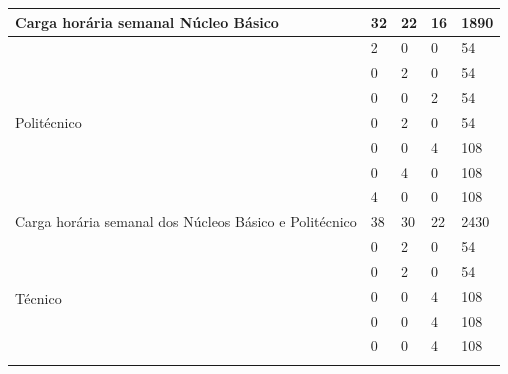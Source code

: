 \documentclass[11pt,fleqn]{book} %
\begin{document}
\begin{table}[H]
{\begin{tabular}{|l|l|l|l|l|l|}
			\multicolumn{2}{|l|}{Carga horária semanal Núcleo Básico}                  & 32         & 22        & 16        & 1890      \\ \hline
			\multirow{7}{*}{Politécnico}   
			& \nameref{disc:info}                                                      & 2          & 0         & 0         & 54        \\ \cline{2-6} 
			& \nameref{disc:espanhol_libras}                                           & 0          & 2         & 0         & 54        \\ \cline{2-6} 
			& \nameref{disc:fermentacao}                                               & 0          & 0         & 2         & 54        \\ \cline{2-6} 
			& \nameref{disc:bioquimica}                                                & 0          & 2         & 0         & 54        \\ \cline{2-6} 
			& \nameref{disc:microbiologia}                                             & 0          & 0         & 4         & 108       \\ \cline{2-6} 
			& \nameref{disc:biomol}                                                    & 0          & 4         & 0         & 108       \\ \cline{2-6} 
			& \nameref{disc:bioeticalab}                                               & 4          & 0         & 0         & 108       \\ \hline			
			\multicolumn{2}{|l|}{Carga horária semanal dos Núcleos Básico  e Politécnico}  & 38         & 30        & 22        & 2430      \\ \hline
			\multirow{7}{*}{Técnico}       
			& \nameref{disc:biotecAnimal}                                              & 0          & 2         & 0         & 54       \\ \cline{2-6} 
			& \nameref{disc:biotecVegetal}                                             & 0          & 2         & 0         & 54       \\ \cline{2-6} 
			& \nameref{disc:biotecAlimentos}                                           & 0          & 0         & 4         & 108       \\ \cline{2-6} 
			& \nameref{disc:biotecFarmacos}                                            & 0          & 0         & 4         & 108       \\ \cline{2-6} 
			& \nameref{disc:biotecSaude}                                               & 0          & 0         & 4         & 108       \\ \cline{2-6} 

\end{tabular}}
\end{table}
\end{document}
